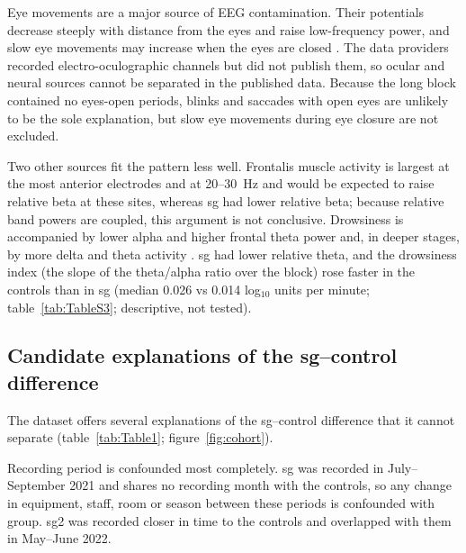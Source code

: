 Eye movements are a major source of EEG contamination. Their potentials decrease steeply with distance from the eyes and raise low-frequency power, and slow eye movements may increase when the eyes are closed \cite{Croft2000}. The data providers recorded electro-oculographic channels \cite{RodriguezAlvarez2023} but did not publish them, so ocular and neural sources cannot be separated in the published data. Because the long block contained no eyes-open periods, blinks and saccades with open eyes are unlikely to be the sole explanation, but slow eye movements during eye closure are not excluded.

Two other sources fit the pattern less well. Frontalis muscle activity is largest at the most anterior electrodes and at 20--30~Hz \cite{Goncharova2003} and would be expected to raise relative beta at these sites, whereas sg had lower relative beta; because relative band powers are coupled, this argument is not conclusive. Drowsiness is accompanied by lower alpha and higher frontal theta power \cite{Strijkstra2003} and, in deeper stages, by more delta and theta activity \cite{Olbrich2009}. sg had lower relative theta, and the drowsiness index (the slope of the theta/alpha ratio over the block) rose faster in the controls than in sg (median 0.026 vs 0.014 log$_{10}$ units per minute; table~\ref{tab:TableS3}; descriptive, not tested).

\subsection{Candidate explanations of the sg--control difference}
\label{sec:disc-confounds}

The dataset offers several explanations of the sg--control difference that it cannot separate (table~\ref{tab:Table1}; figure~\ref{fig:cohort}).

Recording period is confounded most completely. sg was recorded in July--September 2021 and shares no recording month with the controls, so any change in equipment, staff, room or season between these periods is confounded with group. sg2 was recorded closer in time to the controls and overlapped with them in May--June 2022.

